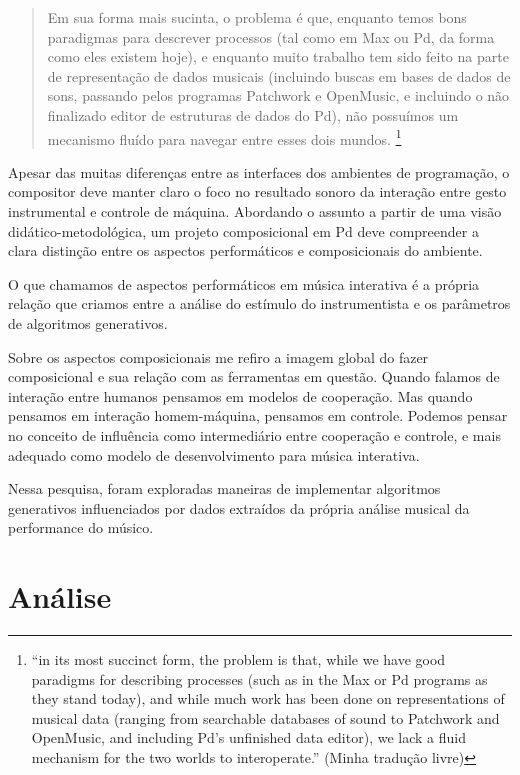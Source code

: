 \documentclass{ppgmus}
\begin{document}
\begin{quote}
Em sua forma mais sucinta, o problema é que, enquanto temos bons
paradigmas para descrever processos (tal como em Max ou Pd, da forma como
eles existem hoje), e enquanto muito trabalho tem sido feito na parte 
de representação de dados musicais (incluindo buscas em bases de dados
de sons, passando pelos programas Patchwork e OpenMusic, e incluindo
o não finalizado editor de estruturas de dados do Pd), não possuímos
um mecanismo fluído para navegar entre esses dois mundos. \cite{puckette04:divide}
  \footnote{``in its most succinct form, the problem is that, while we have good
  paradigms for describing processes (such as in the Max or Pd
  programs as they stand today), and while much work has been done on
  representations of musical data (ranging from searchable databases
  of sound to Patchwork and OpenMusic, and including Pd's unfinished
  data editor), we lack a fluid mechanism for the two worlds to
  interoperate.'' (Minha tradução livre)} 
\end{quote}

Apesar das muitas diferenças entre
as interfaces dos ambientes de programação, 
o compositor deve manter claro o foco no resultado sonoro  da interação entre
gesto instrumental e controle de máquina.
Abordando o assunto
a partir de uma visão didático-metodológica, um projeto
composicional em Pd deve compreender a clara distinção entre os
aspectos performáticos e composicionais do ambiente. 

O que chamamos de aspectos performáticos em música interativa 
é a própria relação que criamos entre a  análise do estímulo
do instrumentista e os parâmetros de algoritmos generativos.

Sobre os aspectos composicionais me refiro a imagem global
do fazer composicional e sua relação com as ferramentas em questão.
Quando falamos de interação entre humanos pensamos em modelos
de cooperação. Mas quando pensamos em interação homem-máquina, 
pensamos em controle. Podemos pensar no conceito de influência como 
intermediário entre cooperação e controle, e mais adequado como
modelo de desenvolvimento para música interativa.

Nessa pesquisa, foram exploradas maneiras de
implementar algoritmos generativos influenciados por dados
extraídos da própria análise musical da
performance do músico.


\section{Análise}
\label{sec-analise-geral}
\end{document}
